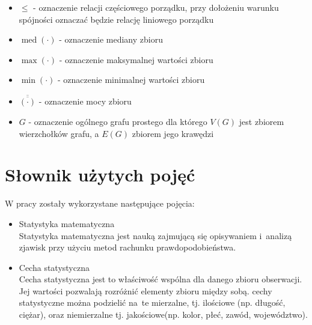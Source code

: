 \documentclass[12pt,a4paper]{report}
\newcommand{\mediana}{\operatorname{med}}
\newcommand{\licznosc}[1]{\overline{\overline{#1}}}
\begin{document}
\begin{itemize}
\item $\leq$ - oznaczenie relacji częściowego porządku, przy dołożeniu warunku spójności oznaczać będzie relację liniowego porządku
\item $\mediana{(\cdot)}$ - oznaczenie mediany zbioru
\item $\max{(\cdot)}$ - oznaczenie maksymalnej wartości zbioru
\item $\min{(\cdot)}$ - oznaczenie minimalnej wartości zbioru
\item $\licznosc{(\cdot)}$ - oznaczenie mocy zbioru
\item $G$ - oznaczenie ogólnego grafu prostego dla którego $V(G)$ jest zbiorem wierzchołków grafu, a $E(G)$ zbiorem jego krawędzi




\end{itemize}


\section{Słownik użytych pojęć}
W pracy zostały wykorzystane następujące pojęcia:
\begin{itemize}
\item Statystyka matematyczna \cite[w oparciu o rozdział 1]{krysicki1999}\\
Statystyka matematyczna jest nauką zajmującą się opisywaniem i~analizą zjawisk przy użyciu metod rachunku prawdopodobieństwa. 


 
 
\item Cecha statystyczna \cite[Rozdział 1]{krysicki1999}\\
Cecha statystyczna jest to właściwość wspólna dla danego zbioru obserwacji. Jej wartości pozwalają rozróżnić elementy zbioru między sobą. cechy statystyczne można podzielić na~te mierzalne, tj. ilościowe (np. długość, ciężar), oraz niemierzalne tj. jakościowe(np. kolor, płeć, zawód, województwo).

\end{itemize}
\end{document}
